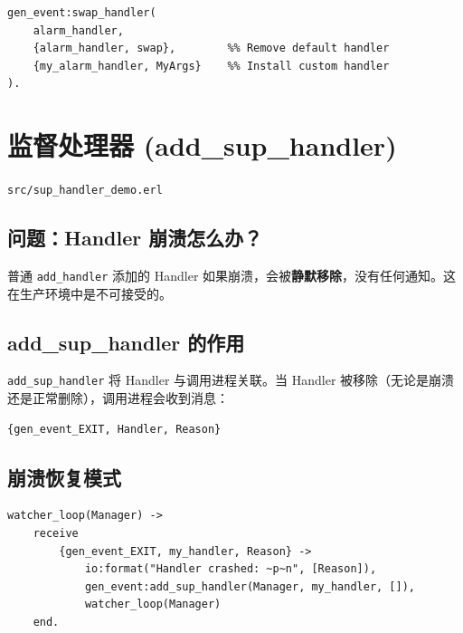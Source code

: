 \documentclass[a4paper,11pt]{article}
\begin{document}
\begin{lstlisting}[style=erlangstyle]
%% OTP alarm_handler typical usage
gen_event:swap_handler(
    alarm_handler,
    {alarm_handler, swap},        %% Remove default handler
    {my_alarm_handler, MyArgs}    %% Install custom handler
).
\end{lstlisting}


\section{监督处理器 (add\_sup\_handler)}

\begin{notebox}[源码文件]
\texttt{src/sup\_handler\_demo.erl}
\end{notebox}

\subsection{问题：Handler 崩溃怎么办？}

普通 \texttt{add\_handler} 添加的 Handler 如果崩溃，会被\textbf{静默移除}，没有任何通知。这在生产环境中是不可接受的。

\subsection{add\_sup\_handler 的作用}

\texttt{add\_sup\_handler} 将 Handler 与调用进程关联。当 Handler 被移除（无论是崩溃还是正常删除），调用进程会收到消息：

\begin{lstlisting}[style=erlangstyle]
{gen_event_EXIT, Handler, Reason}
\end{lstlisting}

\subsection{崩溃恢复模式}

\begin{lstlisting}[style=erlangstyle]
watcher_loop(Manager) ->
    receive
        {gen_event_EXIT, my_handler, Reason} ->
            io:format("Handler crashed: ~p~n", [Reason]),
            gen_event:add_sup_handler(Manager, my_handler, []),
            watcher_loop(Manager)
    end.
\end{lstlisting}
\end{document}
